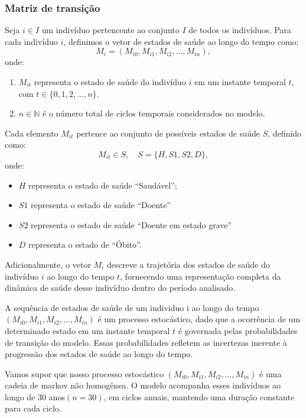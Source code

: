 \documentclass[12pt]{article}
\theoremstyle{break}
\begin{document}
\subsubsection{Matriz de transição}

Seja \( i \in I \) um indivíduo pertencente ao conjunto \( I \) de todos os indivíduos. Para cada indivíduo \( i \), definimos o vetor de estados de saúde ao longo do tempo como:
\[
M_i = (M_{i0}, M_{i1}, M_{i2}, \ldots, M_{in}),
\]
onde:
\begin{enumerate}
    \item \( M_{it} \) representa o estado de saúde do indivíduo \( i \) em um instante temporal \( t \), com \( t \in \{0, 1, 2, \ldots, n\} \).
    \item \( n \in \mathbb{N} \) é o número total de ciclos temporais considerados no modelo.
\end{enumerate}

Cada elemento \( M_{it} \) pertence ao conjunto de possíveis estados de saúde \( S \), definido como:
\[
M_{it} \in S, \quad S = \{H, S1, S2, D\},
\]
onde:
\begin{itemize}
    \item \( H \) representa o estado de saúde ``Saudável'';
    \item \( S1 \) representa o estado de saúde ``Doente''

    \item \( S2 \) representa o estado de saúde ``Doente em estado grave''
    
    \item \( D \) representa o estado de  ``Óbito''.
\end{itemize}

Adicionalmente, o vetor \( M_i \) descreve a trajetória dos estados de saúde do indivíduo \( i \) ao longo do tempo \( t \), fornecendo uma representação completa da dinâmica de saúde desse indivíduo dentro do período analisado.

A sequência de estados de saúde de um individuo i ao longo do tempo $(M_{i0}, M_{i1}, M_{i2}, \ldots, M_{in})$  é  um processo estocástico, dado que a ocorrência de um determinado estado em um instante temporal $t$ é governada pelas probabilidades de transição do modelo. Essas probabilidades refletem as  incertezas inerente à progressão dos estados de saúde ao longo do tempo.



Vamos supor que nosso processo estocástico $(M_{i0}, M_{i1}, M_{i2}, \ldots, M_{in})$ é uma cadeia de markov não homogênea. O modelo acompanha esses indivíduos ao longo de 30 anos$(n = 30)$, em ciclos anuais, mantendo uma duração constante para cada ciclo.
\end{document}
